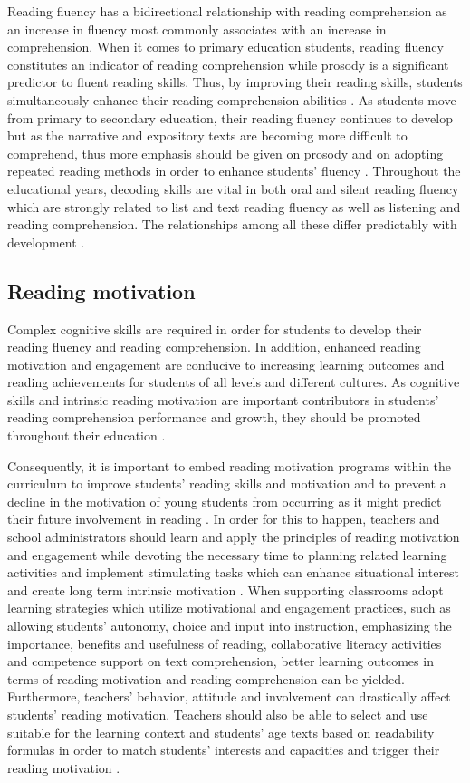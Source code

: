 \documentclass[english]{textolivre}
\begin{document}
Reading fluency has a bidirectional relationship with reading comprehension as an increase in fluency most commonly associates with an increase in comprehension. When it comes to primary education students, reading fluency constitutes an indicator of reading comprehension while prosody is a significant predictor to fluent reading skills. Thus, by improving their reading skills, students simultaneously enhance their reading comprehension abilities \cite{basaran_okudugunu_2013}. As students move from primary to secondary education, their reading fluency continues to develop but as the narrative and expository texts are becoming more difficult to comprehend, thus more emphasis should be given on prosody and on adopting repeated reading methods in order to enhance students’ fluency \cite{alvarez-canizo_reading_2020}. Throughout the educational years, decoding skills are vital in both oral and silent reading fluency which are strongly related to list and text reading fluency as well as listening and reading comprehension. The relationships among all these differ predictably with development \cite{kim_developmental_2012}.

\subsection{Reading motivation}
Complex cognitive skills are required in order for students to develop their reading fluency and reading comprehension. In addition, enhanced reading motivation and engagement are conducive to increasing learning outcomes and reading achievements for students of all levels and different cultures. As cognitive skills and intrinsic reading motivation are important contributors in students’ reading comprehension performance and growth, they should be promoted throughout their education \cite{tan_reading_2020}.

Consequently, it is important to embed reading motivation programs within the curriculum to improve students’ reading skills and motivation and to prevent a decline in the motivation of young students from occurring as it might predict their future involvement in reading \cite{nevo_enhancing_2020}. In order for this to happen, teachers and school administrators should learn and apply the principles of reading motivation and engagement while devoting the necessary time to planning related learning activities and implement stimulating tasks which can enhance situational interest and create long term intrinsic motivation \cite{guthrie_influences_2006}. When supporting classrooms adopt learning strategies which utilize motivational and engagement practices, such as allowing students’ autonomy, choice and input into instruction, emphasizing the importance, benefits and usefulness of reading, collaborative literacy activities and competence support on text comprehension, better learning outcomes in terms of reading motivation and reading comprehension can be yielded. Furthermore, teachers’ behavior, attitude and involvement can drastically affect students’ reading motivation. Teachers should also be able to select and use suitable for the learning context and students’ age texts based on readability formulas in order to match students’ interests and capacities and trigger their reading motivation \cite{pearson2017}.
\end{document}
